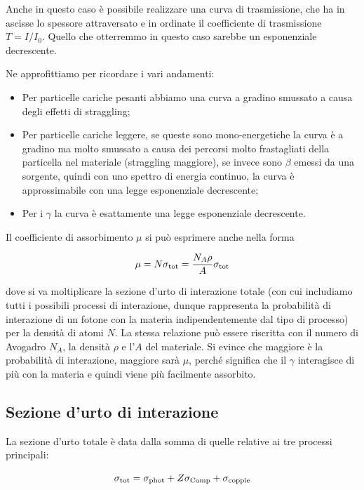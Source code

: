 Anche in questo caso è possibile realizzare una curva di trasmissione, che ha in ascisse lo spessore attraversato e in ordinate il coefficiente di trasmissione $T=I/I_0$. Quello che otterremmo in questo caso sarebbe un esponenziale decrescente.

Ne approfittiamo per ricordare i vari andamenti:

\begin{itemize}
    \item Per particelle cariche pesanti abbiamo una curva a gradino smussato a causa degli effetti di straggling;
    \item Per particelle cariche leggere, se queste sono mono-energetiche la curva è a gradino ma molto smussato a causa dei percorsi molto frastagliati della particella nel materiale (straggling maggiore), se invece sono $\beta$ emessi da una sorgente, quindi con uno spettro di energia continuo, la curva è approssimabile con una legge esponenziale decrescente;
    \item Per i $\gamma$ la curva è esattamente una legge esponenziale decrescente.
\end{itemize}

Il coefficiente di assorbimento $\mu$ si può esprimere anche nella forma

\begin{equation*}
    \mu=N \sigma_{\rm tot}
    =\frac{N_A \rho}{A} \sigma_{\rm tot}
\end{equation*}

dove si va moltiplicare la sezione d'urto di interazione totale (con cui includiamo tutti i possibili processi di interazione, dunque rappresenta la probabilità di interazione di un fotone con la materia indipendentemente dal tipo di processo) per la densità di atomi $N$. La stessa relazione può essere riscritta con il numero di Avogadro $N_A$, la densità $\rho$ e l'$A$ del materiale. Si evince che maggiore è la probabilità di interazione, maggiore sarà $\mu$, perché significa che il $\gamma$ interagisce di più con la materia e quindi viene più facilmente assorbito.

\subsection{Sezione d'urto di interazione}

La sezione d'urto totale è data dalla somma di quelle relative ai tre processi principali:

\begin{equation*}
    \sigma_{\rm tot}
    =\sigma_{\rm phot} + Z \sigma_{\rm Comp} + \sigma_{\rm coppie}
\end{equation*}

